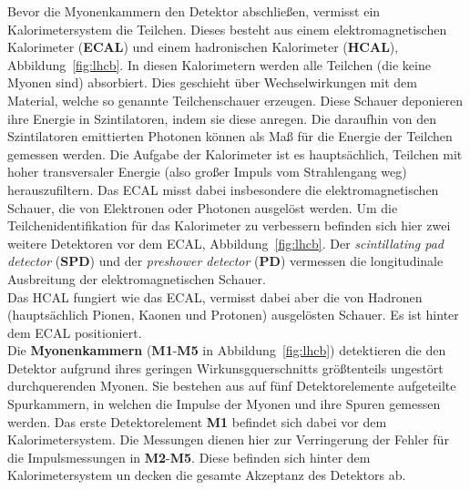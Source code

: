 %
Bevor die Myonenkammern den Detektor abschließen, vermisst ein Kalorimetersystem die Teilchen. Dieses besteht aus einem elektromagnetischen Kalorimeter (\textbf{ECAL}) und einem hadronischen Kalorimeter (\textbf{HCAL}), Abbildung~\ref{fig:lhcb}. In  diesen Kalorimetern werden alle Teilchen (die keine Myonen sind) absorbiert. Dies geschieht über Wechselwirkungen mit dem Material, welche so genannte Teilchenschauer erzeugen. Diese Schauer deponieren ihre Energie in Szintilatoren, indem sie diese anregen. Die daraufhin von den Szintilatoren emittierten Photonen können als Maß für die Energie der Teilchen gemessen werden. Die Aufgabe der Kalorimeter ist es hauptsächlich, Teilchen mit hoher transversaler Energie (also großer Impuls vom Strahlengang weg) herauszufiltern\cite{lhcb}. Das ECAL misst dabei insbesondere die elektromagnetischen Schauer, die von Elektronen oder Photonen ausgelöst werden. Um die Teilchenidentifikation für das Kalorimeter zu verbessern befinden sich hier zwei weitere Detektoren vor dem ECAL, Abbildung~\ref{fig:lhcb}. Der \textit{scintillating pad detector} (\textbf{SPD}) und der \textit{preshower detector} (\textbf{PD}) vermessen die longitudinale Ausbreitung der elektromagnetischen Schauer.\\
Das HCAL fungiert wie das ECAL, vermisst dabei aber die von Hadronen (hauptsächlich Pionen, Kaonen und Protonen) ausgelösten Schauer. Es ist hinter dem ECAL positioniert. \\
%
Die \textbf{Myonenkammern} (\textbf{M1}-\textbf{M5} in Abbildung~\ref{fig:lhcb}) detektieren die den Detektor aufgrund ihres geringen Wirkunsgquerschnitts größtenteils ungestört durchquerenden Myonen. Sie bestehen aus auf fünf Detektorelemente aufgeteilte Spurkammern, in welchen die Impulse der Myonen und ihre Spuren gemessen werden. Das erste Detektorelement \textbf{M1} befindet sich dabei vor dem Kalorimetersystem. Die Messungen dienen hier zur Verringerung der Fehler für die Impulsmessungen in \textbf{M2}-\textbf{M5}. Diese befinden sich hinter dem Kalorimetersystem un decken die gesamte Akzeptanz des Detektors ab\cite{lhcb}.
